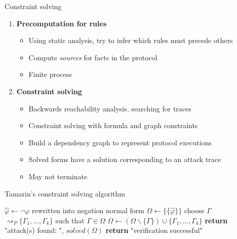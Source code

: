 \documentclass[11pt,aspectratio=169]{beamer}
\begin{document}
\begin{frame}[fragile]{Constraint solving}
    \begin{enumerate}
        \item \textbf{Precomputation for rules}
            \begin{itemize}
                \item Using static analysis, try to infer which rules must 
                      precede others
                \item Compute \textit{sources} for facts in the protocol
                \item Finite process
            \end{itemize}
        \item \textbf{Constraint solving}
            \begin{itemize}
                \item Backwards reachability analysis, searching for traces
                \item Constraint solving with formula and graph constraints
                \item Build a dependency graph to represent protocol executions
                \item Solved forms have a solution corresponding to an attack 
                      trace
                \item May not terminate
            \end{itemize}
    \end{enumerate}
\end{frame}

\begin{frame}[fragile]{Tamarin's constraint solving algorithm}
    \begin{algorithmic}[1]
            \State $\hat{\varphi} \gets \neg \varphi$ rewritten into negation normal form
            \State $\Omega \gets \{\{\hat{\varphi}\}\}$
                \State choose $\Gamma$ $\rightsquigarrow_P \{\Gamma_1, \dots, \Gamma_k\}$ such that $\Gamma \in \Omega$
                \State $\Omega \gets (\Omega \smallsetminus \{\Gamma\}) \cup \{\Gamma_1, \dots, \Gamma_k\}$
            \EndWhile
                \State \textbf{return} "attack(s) found: ", $\mathit{solved}(\Omega)$
            \Else
                \State \textbf{return} "verification successful"
            \EndIf
            \EndFunction
    \end{algorithmic}
\end{frame}
\end{document}
